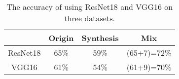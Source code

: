 \begin{table}
    \centering
    \begin{tabular}{ | c | c | c | c | }
      \hline
     & Origin & Synthesis & Mix \\
     \hline
     ResNet18 & 65\% & 59\% & (65+7)=72\% \\
     \hline
     VGG16 & 61\% & 54\% & (61+9)=70\% \\
     \hline
    \end{tabular}
    \caption{The accuracy of using ResNet18 and VGG16 on three datasets.}
    \label{table:classification_result}
  \end{table}